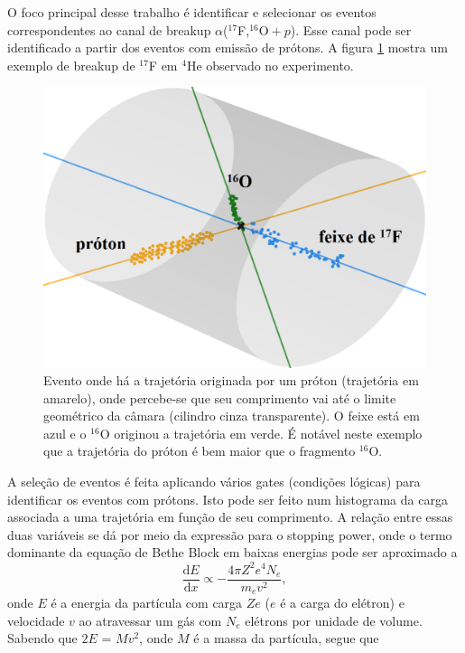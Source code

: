\documentclass[a4paper,12pt,oneside]{book}
\begin{document}
\par O foco principal desse trabalho é identificar e selecionar 
os eventos correspondentes ao canal de breakup $\alpha$($^{17}$F,$^{16}\mathrm{O}+p$). Esse canal pode ser identificado a partir dos eventos com emissão de prótons. A figura \ref{fig:exemplo_proton_16O} mostra um exemplo de breakup de $^{17}$F em $^4$He observado no experimento.

\begin{figure}[H]
    \centering
    \includegraphics[scale = 1., width=0.75\columnwidth]{figs/evento_ex_run_261_evento_5853_2.png}
    \caption{Evento onde há a trajetória originada por um próton (trajetória em amarelo), onde percebe-se que seu comprimento vai até o limite geométrico da câmara (cilindro cinza transparente). O feixe está em azul e o $^{16}$O originou a trajetória em verde. É notável neste exemplo que a trajetória do próton é bem maior que o fragmento $^{16}$O.}
    \label{fig:exemplo_proton_16O}
\end{figure}

\par A seleção de eventos é feita aplicando vários gates (condições lógicas) para identificar os eventos com prótons. Isto pode ser feito num histograma da carga associada a uma trajetória em função de seu comprimento. A relação entre essas duas variáveis se dá por meio da expressão para o stopping power, onde o termo dominante da equação de Bethe Block \cite{leo1988techniques} em baixas energias pode ser aproximado a
\begin{equation}\label{eq:bethe_block_low_energies_1}
	\frac{\mathrm{d}E}{\mathrm{d}x} \propto -\frac{4\pi Z^2  e^4 N_e}{m_ev^2},
\end{equation}
onde $E$ é a energia da partícula com carga $Ze$ ($e$ é a carga do elétron) e velocidade $v$ ao atravessar um gás com $N_e$ elétrons por unidade de volume. Sabendo que $2E$ = $Mv^2$, onde $M$ é a massa da partícula, segue que
\end{document}
